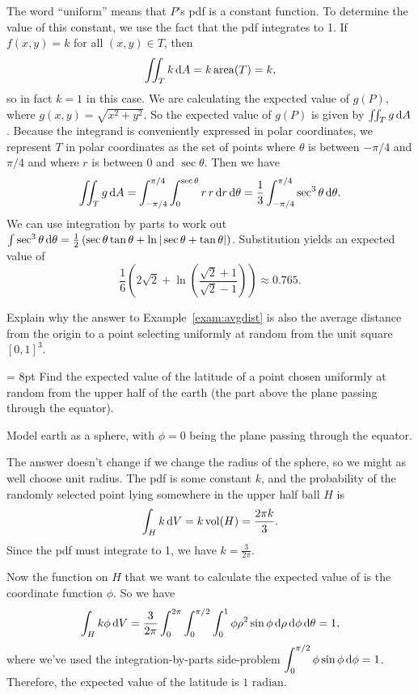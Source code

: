 \documentclass{watsonbook}
\begin{document}
\begin{solution}
  The word ``uniform'' means that $P$'s pdf is a constant function. To
  determine the value of this constant, we use the fact that the pdf
  integrates to 1. If $f(x,y) = k$ for all $(x,y) \in T$, then
  \[
    \iint_T k \, \mathrm{d} A = k\, \mathrm{area}(T) = k, 
  \]
  so in fact $k = 1$ in this case. We are calculating the expected
  value of $g(P)$, where $g(x,y) = \sqrt{x^2 + y^2}$. So the expected
  value of $g(P)$ is given by $\iint_T g \, \mathrm{d} A$. Because the
  integrand is conveniently expressed in polar coordinates, we
  represent $T$ in polar coordinates as the set of points where
  $\theta$ is between $-\pi/4$ and $\pi/4$ and where $r$ is between 0
  and $\sec \theta$. Then we have
  \[
    \iint_T g \, \mathrm{d} A = \int_{-\pi/4}^{\pi/4} \int_0^{\sec \theta} r
    \, r \, \mathrm{d} r\, \mathrm{d}\theta = \frac{1}{3} \int_{-\pi/4}^{\pi/4} \sec^3
    \theta \, \mathrm{d}\theta. 
  \]
  We can use integration by parts to work out
  $\int \sec^3 \theta \, \mathrm{d} \theta = \frac{1}{2}\left(\sec \theta \tan
    \theta + \ln|\sec\theta + \tan \theta|\right)$.
  Substitution yields an expected value of
  \[
    \boxed{\frac{1}{6}\left(2\sqrt{2} +
      \ln\left(\frac{\sqrt{2}+1}{\sqrt{2}-1}\right)\right) \approx
    0.765.}
  \]
\end{solution}

\begin{example}{}{}
  Explain why the answer to Example~\ref{exam:avgdist} is also the
  average distance from the origin to a point selecting uniformly at
  random from the unit square $[0,1]^3$. 
\end{example}

\begin{example}{}{} \parskip = 8pt
  Find the expected value of the latitude of a point chosen uniformly
  at random from the upper half of the earth (the part above the plane
  passing through the equator).

  Model earth as a sphere, with $\phi = 0$ being the plane
  passing through the equator. 
\end{example}

\begin{solution}
  The answer doesn't change if we change the radius of the sphere, so
  we might as well choose unit radius. The pdf is some constant $k$,
  and the probability of the randomly selected point lying somewhere
  in the upper half ball $H$ is
  \[
    \int_H k \, \mathrm{d} V = k\, \mathrm{vol}(H) = \frac{2\pi k}{3}. 
  \]
  Since the pdf must integrate to 1, we have $k =
  \tfrac{3}{2\pi}$.

  Now the function on $H$ that we want to calculate the expected value
  of is the coordinate function $\phi$. So we have
  \[
    \int_H k\phi \, \mathrm{d} V = \frac{3}{2\pi} \int_0^{2\pi} \int
    _0^{\pi/2}\int_{0}^{1} \phi \rho^2 \sin \phi \, \mathrm{d} \rho \, \mathrm{d} \phi
    \, \mathrm{d} \theta = 1, 
  \]
  where we've used the integration-by-parts side-problem $\displaystyle{\int_0^{\pi/2} \phi
  \sin \phi \, \mathrm{d}\phi = 1}$. Therefore, the expected value of the
latitude is $\boxed{1 \text{ radian}}$.  
\end{solution}
\end{document}
